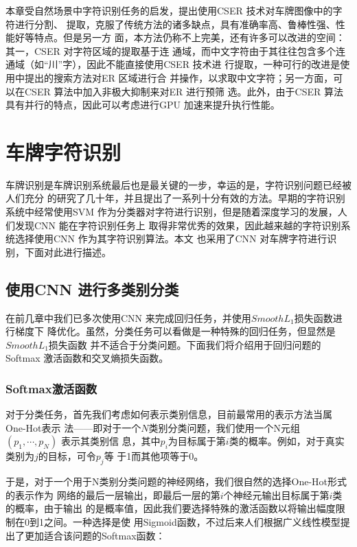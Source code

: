 本章受自然场景中字符识别任务的启发，提出使用CSER 技术对车牌图像中的字符进行分割、
提取，克服了传统方法的诸多缺点，具有准确率高、鲁棒性强、性能好等特点。但是另一方
面，本方法仍称不上完美，还有许多可以改进的空间：其一，CSER 对字符区域的提取基于连
通域，而中文字符由于其往往包含多个连通域（如“川”字），因此不能直接使用CSER 技术进
行提取，一种可行的改进是使用\cite{Neumann:2011dy}中提出的搜索方法对ER 区域进行合
并操作，以求取中文字符；另一方面，可以在CSER 算法中加入非极大抑制来对ER 进行预筛
选。此外，由于CSER 算法具有并行的特点，因此可以考虑进行GPU 加速来提升执行性能。

\chapter{车牌字符识别}

车牌识别是车牌识别系统最后也是最关键的一步，幸运的是，字符识别问题已经被人们充分
的研究了几十年，并且提出了一系列十分有效的方法。早期的字符识别系统中经常使用SVM 
作为分类器对字符进行识别，但是随着深度学习的发展，人们发现CNN 能在字符识别任务上
取得非常优秀的效果，因此越来越的字符识别系统选择使用CNN 作为其字符识别算法。本文
也采用了CNN 对车牌字符进行识别，下面对此进行描述。

\section{使用CNN 进行多类别分类}

在前几章中我们已多次使用CNN 来完成回归任务，并使用$Smooth L_1$损失函数进行梯度下
降优化。虽然，分类任务可以看做是一种特殊的回归任务，但显然是$Smooth L_1$损失函数
并不适合于分类问题。下面我们将介绍用于回归问题的Softmax 激活函数和交叉熵损失函数。

\subsection{Softmax激活函数}

对于分类任务，首先我们考虑如何表示类别信息，目前最常用的表示方法当属One-Hot表示
法——即对于一个$N$类别分类问题，我们使用一个N元组 $(p_1, \cdots, p_N)$ 表示其类别信
息，其中$p_i$为目标属于第$i$类的概率。例如，对于真实类别为$j$的目标，可令$p_j$等
于1而其他项等于0。

于是，对于一个用于N类别分类问题的神经网络，我们很自然的选择One-Hot形式的表示作为
网络的最后一层输出，即最后一层的第$i$个神经元输出目标属于第$i$类的概率，由于输出
的是概率值，因此我们要选择特殊的激活函数以将输出幅度限制在0到1之间。一种选择是使
用Sigmoid函数，不过后来人们根据广义线性模型提出了更加适合该问题的Softmax函数：

